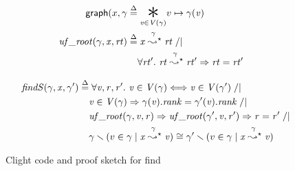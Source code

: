 \begin{figure}[t]
{\footnotesize
\begin{flushleft}
\begin{minipage}[c]{0.4\textwidth}
\begin{equation*}
\begin{split}
\label{eqn:ufgraphdefn}
\p{graph}(x, \gamma \; \defeq& \; \underset{\m{v} \in \m{V}(\gamma)}{\bigstar} v\mapsto\gamma(\m{v}) \\
\m{uf\_root}(\gamma,\m{x},\m{rt}) \; \defeq& \; \m{x} \mathrel{{\stackrel{\gamma~}{\leadsto^{\star}}}} \m{rt} \; /| \null \\ 
&\forall \m{rt'}.~\m{rt} \mathrel{{\stackrel{\gamma~}{\leadsto^{\star}}}} \m{rt'} => \m{rt} = \m{rt'}
\end{split}
\end{equation*}
\end{minipage}
\vline
\begin{minipage}[c]{0.5\textwidth}
\begin{equation*}
\begin{split}
\quad \mathit{findS}(\gamma,\mathit{x},\gamma') \; \mathbin{\stackrel{\Delta}{=}}& \; \forall \mathit{v}, \mathit{r}, \mathit{r'}.~ \mathit{v}\in\mathit{V}(\gamma) <=> \mathit{v}\in\mathit{V}(\gamma') \; /| \\ 
&\mathit{v}\in\mathit{V}(\gamma) => \gamma(\mathit{v}).\mathit{rank} = \gamma'(\mathit{v}).\mathit{rank} \; /|  \\
&\mathit{uf\_root}(\gamma, \mathit{v}, \mathit{r}) => \mathit{uf\_root}(\gamma', \mathit{v}, \mathit{r'}) => \mathit{r} = \mathit{r'} \; /|  \\ 
& \gamma \smallsetminus (v \in \gamma \mid \mathit{x} \mathrel{{\stackrel{\gamma~}{\leadsto^{\star}}}} \mathit{v}) \cong \gamma' \smallsetminus (v \in \gamma \mid \mathit{x} \mathrel{{\stackrel{\gamma~}{\leadsto^{\star}}}} \mathit{v})
\end{split}
\end{equation*}
\end{minipage}
\end{flushleft}
}





\vspace{-0.4em}
\caption{Clight code and proof sketch for find}
\label{fig:find}
\vspace{-1em}
\end{figure}
